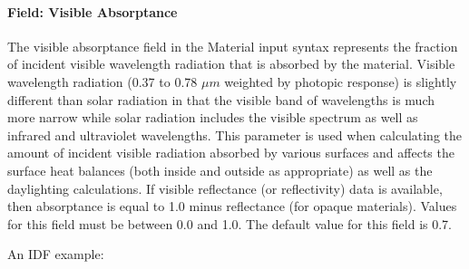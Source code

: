 \paragraph{Field: Visible Absorptance}\label{field-visible-absorptance}

The visible absorptance field in the Material input syntax represents the fraction of incident visible wavelength radiation that is absorbed by the material. Visible wavelength radiation (0.37 to 0.78 $\mu{}m$ weighted by photopic response) is slightly different than solar radiation in that the visible band of wavelengths is much more narrow while solar radiation includes the visible spectrum as well as infrared and ultraviolet wavelengths. This parameter is used when calculating the amount of incident visible radiation absorbed by various surfaces and affects the surface heat balances (both inside and outside as appropriate) as well as the daylighting calculations. If visible reflectance (or reflectivity) data is available, then absorptance is equal to 1.0 minus reflectance (for opaque materials). Values for this field must be between 0.0 and 1.0. The default value for this field is 0.7.

An IDF example:

